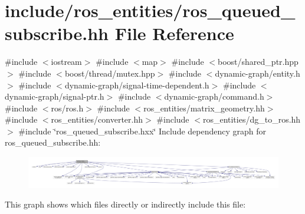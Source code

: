 \hypertarget{ros__queued__subscribe_8hh}{}\section{include/ros\+\_\+entities/ros\+\_\+queued\+\_\+subscribe.hh File Reference}
\label{ros__queued__subscribe_8hh}
{\ttfamily \#include $<$iostream$>$}\newline
{\ttfamily \#include $<$map$>$}\newline
{\ttfamily \#include $<$boost/shared\+\_\+ptr.\+hpp$>$}\newline
{\ttfamily \#include $<$boost/thread/mutex.\+hpp$>$}\newline
{\ttfamily \#include $<$dynamic-\/graph/entity.\+h$>$}\newline
{\ttfamily \#include $<$dynamic-\/graph/signal-\/time-\/dependent.\+h$>$}\newline
{\ttfamily \#include $<$dynamic-\/graph/signal-\/ptr.\+h$>$}\newline
{\ttfamily \#include $<$dynamic-\/graph/command.\+h$>$}\newline
{\ttfamily \#include $<$ros/ros.\+h$>$}\newline
{\ttfamily \#include $<$ros\+\_\+entities/matrix\+\_\+geometry.\+hh$>$}\newline
{\ttfamily \#include $<$ros\+\_\+entities/converter.\+hh$>$}\newline
{\ttfamily \#include $<$ros\+\_\+entities/dg\+\_\+to\+\_\+ros.\+hh$>$}\newline
{\ttfamily \#include \char`\"{}ros\+\_\+queued\+\_\+subscribe.\+hxx\char`\"{}}\newline
Include dependency graph for ros\+\_\+queued\+\_\+subscribe.\+hh\+:
\nopagebreak
\begin{figure}[H]
\begin{center}
\leavevmode
\includegraphics[width=350pt]{ros__queued__subscribe_8hh__incl}
\end{center}
\end{figure}
This graph shows which files directly or indirectly include this file\+:
\nopagebreak
